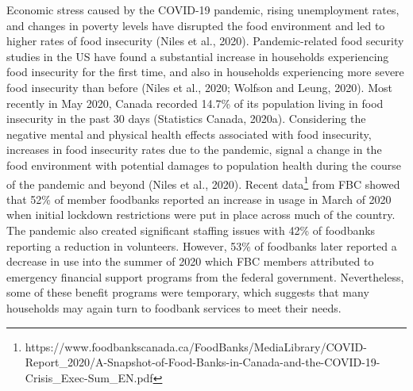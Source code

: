 \documentclass[]{elsarticle} %
\begin{document}
Economic stress caused by the COVID-19 pandemic, rising unemployment
rates, and changes in poverty levels have disrupted the food environment
and led to higher rates of food insecurity (Niles et al., 2020).
Pandemic-related food security studies in the US have found a
substantial increase in households experiencing food insecurity for the
first time, and also in households experiencing more severe food
insecurity than before (Niles et al., 2020; Wolfson and Leung, 2020).
Most recently in May 2020, Canada recorded 14.7\% of its population
living in food insecurity in the past 30 days (Statistics Canada,
2020a). Considering the negative mental and physical health effects
associated with food insecurity, increases in food insecurity rates due
to the pandemic, signal a change in the food environment with potential
damages to population health during the course of the pandemic and
beyond (Niles et al., 2020). Recent data\footnote{https://www.foodbankscanada.ca/FoodBanks/MediaLibrary/COVID-Report\_2020/A-Snapshot-of-Food-Banks-in-Canada-and-the-COVID-19-Crisis\_Exec-Sum\_EN.pdf}
from FBC showed that 52\% of member foodbanks reported an increase in
usage in March of 2020 when initial lockdown restrictions were put in
place across much of the country. The pandemic also created significant
staffing issues with 42\% of foodbanks reporting a reduction in
volunteers. However, 53\% of foodbanks later reported a decrease in use
into the summer of 2020 which FBC members attributed to emergency
financial support programs from the federal government. Nevertheless,
some of these benefit programs were temporary, which suggests that many
households may again turn to foodbank services to meet their needs.
\end{document}
